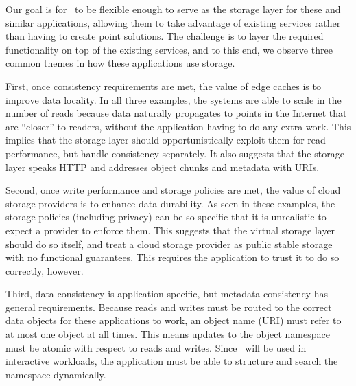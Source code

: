 Our goal is for \Syndicate\ to be flexible enough to serve 
as the storage layer for these and similar applications, allowing
them to take advantage of existing services rather than having to
create point solutions.
The challenge is to layer the required functionality
on top of the existing services, and to this end, we observe three 
common themes in how these applications use storage.  

First, once consistency requirements are
met, the value of edge caches is to improve data locality.
In all three examples, the systems
are able to scale in the number of reads because data naturally
propagates to points in the Internet that are ``closer'' to readers,
without the application having to do any extra work.  This implies that the storage
layer should opportunistically exploit them for read
performance, but handle consistency separately.  It also suggests
that the storage layer speaks HTTP
and addresses object chunks and metadata with URIs.

Second, once write performance and storage policies are met,
the value of cloud storage providers is to 
enhance data durability.  As seen in these examples,
the storage policies (including privacy) can be so specific that it is unrealistic to
expect a provider to enforce them.  This suggests that 
the virtual storage layer should do so itself,
and treat a cloud storage 
provider as public stable storage with no functional guarantees.
This requires the application to trust it to do so correctly, however.

Third, data consistency is application-specific, but metadata
consistency has general requirements.  Because reads and writes must
be routed to the correct data objects for these applications to work,
an object name (URI) must refer to at most one object at all times.
This means updates to the object namespace must be atomic with respect
to reads and writes.  Since \Syndicate\ will be used in interactive
workloads, the application must be able to structure and search the
namespace dynamically.
